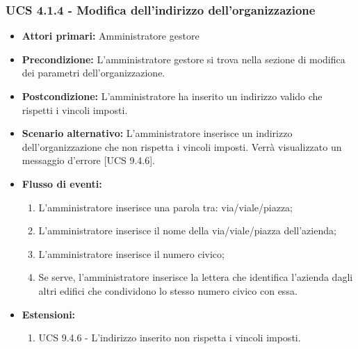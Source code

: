 \subsubsection{UCS 4.1.4 - Modifica dell'indirizzo dell'organizzazione}%

\begin{itemize}
\item \textbf{Attori primari:} Amministratore gestore
\item \textbf{Precondizione:} L'amministratore gestore si trova nella sezione di modifica dei parametri dell'organizzazione.
\item \textbf{Postcondizione:} L'amministratore ha inserito un indirizzo valido che rispetti i vincoli imposti.
\item \textbf{Scenario alternativo:} L'amministratore inserisce un indirizzo dell'organizzazione che non rispetta i vincoli imposti. Verrà visualizzato un messaggio d'errore [UCS 9.4.6].
\item \textbf{Flusso di eventi:}
\begin{enumerate}
    \item L'amministratore inserisce una parola tra: via/viale/piazza;
    \item L'amministratore inserisce il nome della via/viale/piazza dell'azienda;
    \item L'amministratore inserisce il numero civico;
    \item Se serve, l'amministratore inserisce la lettera che identifica l'azienda dagli altri edifici che condividono lo stesso numero civico con essa.
\end{enumerate}
\item \textbf{Estensioni:}
\begin{enumerate}
    \item UCS 9.4.6 - L'indirizzo inserito non rispetta i vincoli imposti.
\end{enumerate}
\end{itemize}

